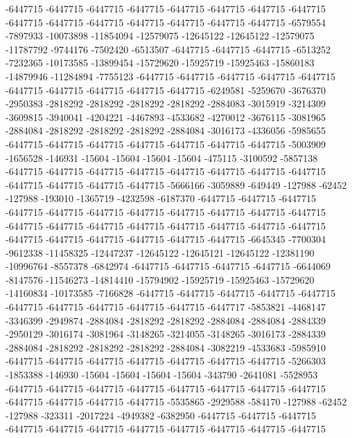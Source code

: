 -6447715 -6447715 -6447715 -6447715 -6447715 -6447715 -6447715 -6447715 -6447715 -6447715 -6447715 -6447715 -6447715 -6447715 -6447715 -6579554 -7897933 -10073898 -11854094 -12579075 -12645122 -12645122 -12579075 -11787792 -9744176 -7502420 -6513507 -6447715 -6447715 -6447715 -6513252 -7232365 -10173585 -13899454 -15729620 -15925719 -15925463 -15860183 -14879946 -11284894 -7755123 -6447715 -6447715 -6447715 -6447715 -6447715 -6447715 -6447715 -6447715 -6447715 -6447715 -6249581 -5259670 -3676370 -2950383 -2818292 -2818292 -2818292 -2818292 -2884083 -3015919 -3214309 -3609815 -3940041 -4204221 -4467893 -4533682 -4270012 -3676115 -3081965 -2884084 -2818292 -2818292 -2818292 -2884084 -3016173 -4336056 -5985655 -6447715 -6447715 -6447715 -6447715 -6447715 -6447715 -6447715 -5003909 -1656528 -146931 -15604 -15604 -15604 -15604 -475115 -3100592 -5857138 -6447715 -6447715 -6447715 -6447715 -6447715 -6447715 -6447715 -6447715 -6447715 -6447715 -6447715 -6447715 -5666166 -3059889 -649449 -127988 -62452 -127988 -193010 -1365719 -4232598 -6187370 -6447715 -6447715 -6447715 -6447715 -6447715 -6447715 -6447715 -6447715 -6447715 -6447715 -6447715
-6447715 -6447715 -6447715 -6447715 -6447715 -6447715 -6447715 -6447715 -6447715 -6447715 -6447715 -6447715 -6447715 -6447715 -6645345 -7700304 -9612338 -11458325 -12447237 -12645122 -12645121 -12645122 -12381190 -10996764 -8557378 -6842974 -6447715 -6447715 -6447715 -6447715 -6644069 -8147576 -11546273 -14814410 -15794902 -15925719 -15925463 -15729620 -14160834 -10173585 -7166828 -6447715 -6447715 -6447715 -6447715 -6447715 -6447715 -6447715 -6447715 -6447715 -6447715 -6447717 -5853821 -4468147 -3346399 -2949874 -2884084 -2818292 -2818292 -2884084 -2884084 -2884339 -2950129 -3016174 -3081964 -3148265 -3214055 -3148265 -3016173 -2884339 -2884084 -2818292 -2818292 -2818292 -2884084 -3082219 -4533683 -5985910 -6447715 -6447715 -6447715 -6447715 -6447715 -6447715 -6447715 -5266303 -1853388 -146930 -15604 -15604 -15604 -15604 -343790 -2641081 -5528953 -6447715 -6447715 -6447715 -6447715 -6447715 -6447715 -6447715 -6447715 -6447715 -6447715 -6447715 -6447715 -5535865 -2929588 -584170 -127988 -62452 -127988 -323311 -2017224 -4949382 -6382950 -6447715 -6447715 -6447715 -6447715 -6447715 -6447715 -6447715 -6447715 -6447715 -6447715 -6447715

